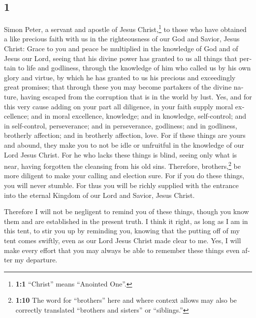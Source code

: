 \begin{paracol}{2}
\begin{otherlanguage}{english}
\hypertarget{section-1}{%
\section{1}\label{section-1}}

 Simon Peter, a servant and apostle of Jesus
Christ,\footnote{\textbf{1:1} ``Christ'' means ``Anointed One''.} to
those who have obtained a like precious faith with us in the
righteousness of our God and Savior, Jesus Christ:  Grace
to you and peace be multiplied in the knowledge of God and of Jesus our
Lord,  seeing that his divine power has granted to us all
things that pertain to life and godliness, through the knowledge of him
who called us by his own glory and virtue,  by which he
has granted to us his precious and exceedingly great promises; that
through these you may become partakers of the divine nature, having
escaped from the corruption that is in the world by lust. 
Yes, and for this very cause adding on your part all diligence, in your
faith supply moral excellence; and in moral excellence, knowledge;
 and in knowledge, self-control; and in self-control,
perseverance; and in perseverance, godliness;  and in
godliness, brotherly affection; and in brotherly affection, love.
 For if these things are yours and abound, they make you
to not be idle or unfruitful in the knowledge of our Lord Jesus Christ.
 For he who lacks these things is blind, seeing only what
is near, having forgotten the cleansing from his old sins.
 Therefore, brothers,\footnote{\textbf{1:10} The word for
  ``brothers'' here and where context allows may also be correctly
  translated ``brothers and sisters'' or ``siblings.''} be more diligent
to make your calling and election sure. For if you do these things, you
will never stumble.  For thus you will be richly supplied
with the entrance into the eternal Kingdom of our Lord and Savior, Jesus
Christ.

 Therefore I will not be negligent to remind you of these
things, though you know them and are established in the present truth.
 I think it right, as long as I am in this tent, to stir
you up by reminding you,  knowing that the putting off of
my tent comes swiftly, even as our Lord Jesus Christ made clear to me.
 Yes, I will make every effort that you may always be
able to remember these things even after my departure.


\end{otherlanguage}
\end{paracol}
